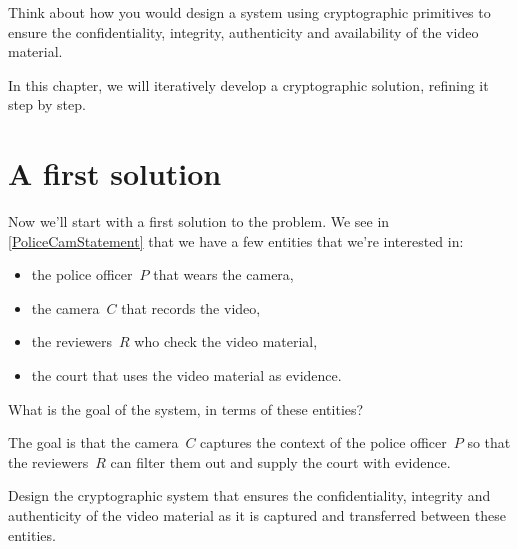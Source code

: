 \begin{exercise}
  Think about how you would design a system using cryptographic primitives to 
  ensure the confidentiality, integrity, authenticity and availability of the 
  video material.
\end{exercise}


In this chapter, we will iteratively develop a cryptographic solution, 
refining it step by step.
\chapterminitoc
\section{A first solution}\label{FirstSolution}

Now we'll start with a first solution to the problem.
We see in \cref{PoliceCamStatement} that we have a few entities that we're 
interested in:
\begin{itemize}
  \item the police officer~\(P\) that wears the camera,
  \item the camera~\(C\) that records the video,
  \item the reviewers~\(R\) who check the video material,
  \item the court that uses the video material as evidence.
\end{itemize}

\begin{exercise}
  What is the goal of the system, in terms of these entities?
\end{exercise}

The goal is that the camera~\(C\) captures the context of the police 
officer~\(P\) so that the reviewers~\(R\) can filter them out and supply the 
court with evidence.

\begin{exercise}
  Design the cryptographic system that ensures the confidentiality, integrity 
  and authenticity of the video material as it is captured and transferred 
  between these entities.
\end{exercise}

